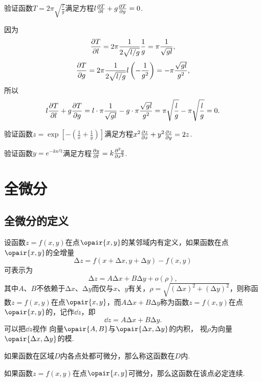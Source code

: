 \begin{example}
验证函数\(T = 2\pi\sqrt{\frac{l}{g}}\)满足方程\(l\pdv{T}{l}+g\pdv{T}{g}=0\).
\begin{solution}
因为\[
\pdv{T}{l} = 2\pi \frac{1}{2\sqrt{l/g}} \frac{1}{g}
= \pi \frac{1}{\sqrt{gl}},
\]\[
\pdv{T}{g} = 2\pi \frac{1}{2\sqrt{l/g}} l \left(-\frac{1}{g^2}\right)
= -\pi \frac{\sqrt{gl}}{g^2},
\]所以\[
l\pdv{T}{l}+g\pdv{T}{g}
= l \cdot \pi \frac{1}{\sqrt{gl}} - g \cdot \pi \frac{\sqrt{gl}}{g^2}
= \pi \sqrt{\frac{l}{g}} - \pi \sqrt{\frac{l}{g}} = 0.
\]
\end{solution}
\end{example}

\begin{example}
验证函数\(z = \exp[-\left(\frac{1}{x}+\frac{1}{y}\right)]\)满足方程\(x^2 \pdv{z}{x} + y^2 \pdv{z}{y} = 2z\).
\end{example}

\begin{example}
验证函数\(y = e^{-k n^2 t}\)满足方程\(\pdv{y}{t} = k \pdv[2]{y}{x}\).
\end{example}

\section{全微分}
\subsection{全微分的定义}
\begin{definition}
设函数\(z=f(x,y)\)在点\(\opair{x,y}\)的某邻域内有定义，如果函数在点\(\opair{x,y}\)的全增量\[
\increment z = f(x+\increment x,y+\increment y)-f(x,y)
\]可表示为\[
\increment z = A \increment x + B \increment y + o(\rho),
\]其中\(A\)、\(B\)不依赖于\(\increment x\)、\(\increment y\)而仅与\(x\)、\(y\)有关，\(\rho=\sqrt{(\increment x)^2+(\increment y)^2}\)，则称函数\(z=f(x,y)\)在点\(\opair{x,y}\)，而\(A \increment x + B \increment y\)称为函数\(z=f(x,y)\)在点\(\opair{x,y}\)的，记作\(\dd{z}\)，即\[
\dd{z} = A \increment x + B \increment y.
\]可以把\(\dd{z}\)视作%
向量\(\opair{A,B}\)与\(\opair{\increment x,\increment y}\)的内积，%
视\(\rho\)为向量\(\opair{\increment x,\increment y}\)的模.

如果函数在区域\(D\)内各点处都可微分，那么称这函数在\(D\)内.
\end{definition}

\begin{theorem}
如果函数\(z=f(x,y)\)在点\(\opair{x,y}\)可微分，那么这函数在该点必定连续.
\end{theorem}

